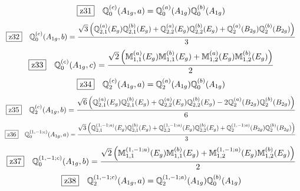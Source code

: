 \documentclass[fleqn,10pt,landscape]{jsarticle}
\begin{document}
\begin{dmath*}
\hspace*{3mm}\fbox{z31}\quad \mathbb{Q}_{0}^{(c)}(A_{1g},a)=\mathbb{Q}_{0}^{(a)}(A_{1g}) \mathbb{Q}_{0}^{(b)}(A_{1g})
\end{dmath*}
\begin{dmath*}
\hspace*{3mm}\fbox{z32}\quad \mathbb{Q}_{0}^{(c)}(A_{1g},b)=\frac{\sqrt{3} \left(\mathbb{Q}_{2,1}^{(a)}(E_{g}) \mathbb{Q}_{2,1}^{(b)}(E_{g}) + \mathbb{Q}_{2,2}^{(a)}(E_{g}) \mathbb{Q}_{2,2}^{(b)}(E_{g}) + \mathbb{Q}_{2}^{(a)}(B_{2g}) \mathbb{Q}_{2}^{(b)}(B_{2g})\right)}{3}
\end{dmath*}
\begin{dmath*}
\hspace*{3mm}\fbox{z33}\quad \mathbb{Q}_{0}^{(c)}(A_{1g},c)=\frac{\sqrt{2} \left(\mathbb{M}_{1,1}^{(a)}(E_{g}) \mathbb{M}_{1,1}^{(b)}(E_{g}) + \mathbb{M}_{1,2}^{(a)}(E_{g}) \mathbb{M}_{1,2}^{(b)}(E_{g})\right)}{2}
\end{dmath*}
\begin{dmath*}
\hspace*{3mm}\fbox{z34}\quad \mathbb{Q}_{2}^{(c)}(A_{1g},a)=\mathbb{Q}_{2}^{(a)}(A_{1g}) \mathbb{Q}_{0}^{(b)}(A_{1g})
\end{dmath*}
\begin{dmath*}
\hspace*{3mm}\fbox{z35}\quad \mathbb{Q}_{2}^{(c)}(A_{1g},b)=\frac{\sqrt{6} \left(\mathbb{Q}_{2,1}^{(a)}(E_{g}) \mathbb{Q}_{2,1}^{(b)}(E_{g}) + \mathbb{Q}_{2,2}^{(a)}(E_{g}) \mathbb{Q}_{2,2}^{(b)}(E_{g}) - 2 \mathbb{Q}_{2}^{(a)}(B_{2g}) \mathbb{Q}_{2}^{(b)}(B_{2g})\right)}{6}
\end{dmath*}
\begin{dmath*}
\hspace*{3mm}\fbox{z36}\quad \mathbb{Q}_{0}^{(1,-1;c)}(A_{1g},a)=\frac{\sqrt{3} \left(\mathbb{Q}_{2,1}^{(1,-1;a)}(E_{g}) \mathbb{Q}_{2,1}^{(b)}(E_{g}) + \mathbb{Q}_{2,2}^{(1,-1;a)}(E_{g}) \mathbb{Q}_{2,2}^{(b)}(E_{g}) + \mathbb{Q}_{2}^{(1,-1;a)}(B_{2g}) \mathbb{Q}_{2}^{(b)}(B_{2g})\right)}{3}
\end{dmath*}
\begin{dmath*}
\hspace*{3mm}\fbox{z37}\quad \mathbb{Q}_{0}^{(1,-1;c)}(A_{1g},b)=\frac{\sqrt{2} \left(\mathbb{M}_{1,1}^{(1,-1;a)}(E_{g}) \mathbb{M}_{1,1}^{(b)}(E_{g}) + \mathbb{M}_{1,2}^{(1,-1;a)}(E_{g}) \mathbb{M}_{1,2}^{(b)}(E_{g})\right)}{2}
\end{dmath*}
\begin{dmath*}
\hspace*{3mm}\fbox{z38}\quad \mathbb{Q}_{2}^{(1,-1;c)}(A_{1g},a)=\mathbb{Q}_{2}^{(1,-1;a)}(A_{1g}) \mathbb{Q}_{0}^{(b)}(A_{1g})
\end{dmath*}
\end{document}
